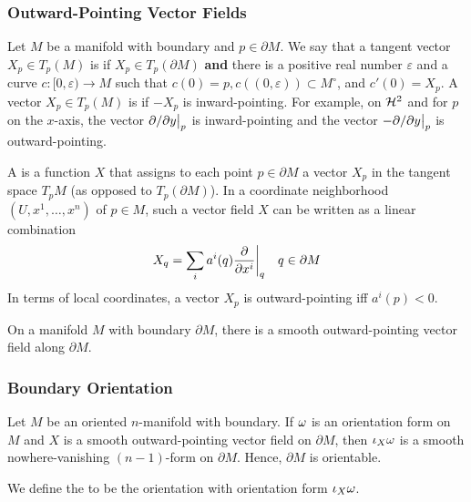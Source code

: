 \subsubsection{Outward-Pointing Vector Fields}

Let \(M\) be a manifold with boundary and \(p \in \partial M\). 
We say that a tangent vector \(X_p \in T_p (M)\) is  if \(X_p \in T_p (\partial M)\) \textbf{and} there is a positive real number \(\varepsilon\) and a curve \(c \colon [0, \varepsilon) \rightarrow M\) such that \(c(0)=p, c((0, \varepsilon)) \subset M^\circ\), and \(c'(0) = X_p\).
A vector \(X_p \in T_p (M)\) is  if \(-X_p\) is inward-pointing.
For example, on \(\mathcal{H}^2\) and for \(p\) on the \(x\)-axis, the vector \(\evalat[\big]{\prt{}{y}}{p}\) is inward-pointing and the vector \(-\evalat[\big]{\prt{}{y}}{p}\) is outward-pointing.

A  is a function \(X\) that assigns to each point \(p \in \partial M\) a vector \(X_p\) in the tangent space \(T_p M\) (as opposed to \(T_p (\partial M)\)).
In a coordinate neighborhood \((U, x^1, \dots, x^n)\) of \(p \in M\), such a vector field \(X\) can be written as a linear combination
\[
    X_q = \sum_i a^i(q) \evalat[\bigg]{\pdv{}{x^i}}{q} \quad q \in \partial M    
\]
In terms of local coordinates, a vector \(X_p\) is outward-pointing iff \(a^i(p) < 0\).

\begin{proposition}{}{}
    On a manifold \(M\) with boundary \(\partial M\), there is a smooth outward-pointing vector field along \(\partial M\).
\end{proposition}

\subsubsection{Boundary Orientation}

\begin{proposition}{}{}
    Let \(M\) be an oriented \(n\)-manifold with boundary.
    If \(\omega\) is an orientation form on \(M\) and \(X\) is a smooth outward-pointing vector field on \(\partial M\), then \(\iota_X \omega\) is a smooth nowhere-vanishing \((n-1)\)-form on \(\partial M\).
    Hence, \(\partial M\) is orientable.
\end{proposition}

We define the  to be the orientation with orientation form \(\iota_X \omega\).

